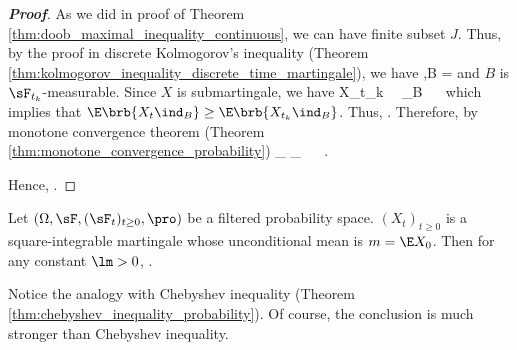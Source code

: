 \begin{proof}[\bf Proof]
As we did in proof of Theorem \ref{thm:doob_maximal_inequality_continuous}, we can have finite subset $J$. Thus, by the proof in discrete Kolmogorov's inequality (Theorem \ref{thm:kolmogorov_inequality_discrete_time_martingale}), we have
\be
\pro{} \leq {},\qquad B = 
\ee
and $B$ is $\sF_{t_k}$-measurable. Since $X$ is submartingale, we have
\be
\E{} \geq X_{t_k}  \ \ra \ \ind_B  \ \ra \ \E{} 
\ee
which implies that $\E\brb{X_t\ind_B} \geq \E\brb{X_{t_k}\ind_B}$. Thus,
\be
\pro{} \leq {} \leq {} \leq {} \leq {}.
\ee
Therefore, by monotone convergence theorem (Theorem \ref{thm:monotone_convergence_probability})
\be
\ind_{} \ua \ind_{} \ \ra \ \pro{} \ua \pro{}.
\ee

Hence,
\be
\pro{} \leq {}.%
\ee%
\end{proof}

\begin{corollary}\label{cor:kolmogorov_inequality_continuous_time_martingale}
Let $(\Omega,\sF,(\sF_t)_{t\geq 0},\pro)$ be a filtered probability space. $(X_t)_{t\geq 0}$ is a square-integrable martingale whose unconditional mean is $m = \E X_0$. Then for any constant $\lm >0$,
\be
\pro{} \leq {}.
\ee
\end{corollary}

\begin{remark}
Notice the analogy with Chebyshev inequality (Theorem \ref{thm:chebyshev_inequality_probability}). Of course, the conclusion is much stronger than Chebyshev inequality.
\end{remark}

